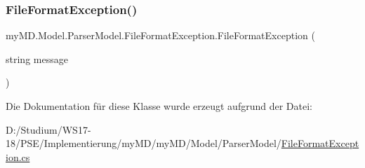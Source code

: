 \subsubsection{\texorpdfstring{File\+Format\+Exception()}{FileFormatException()}\hspace{0.1cm}{\footnotesize\ttfamily [2/2]}}
{\footnotesize\ttfamily my\+M\+D.\+Model.\+Parser\+Model.\+File\+Format\+Exception.\+File\+Format\+Exception (\begin{DoxyParamCaption}\item[{string}]{message }\end{DoxyParamCaption})}



Die Dokumentation für diese Klasse wurde erzeugt aufgrund der Datei\+:\begin{DoxyCompactItemize}
\item 
D\+:/\+Studium/\+W\+S17-\/18/\+P\+S\+E/\+Implementierung/my\+M\+D/my\+M\+D/\+Model/\+Parser\+Model/\mbox{\hyperlink{_file_format_exception_8cs}{File\+Format\+Exception.\+cs}}\end{DoxyCompactItemize}
